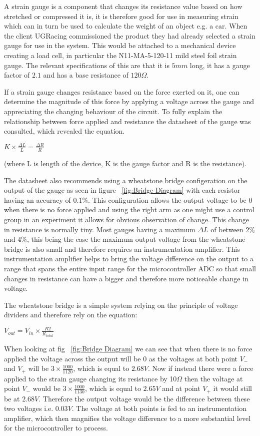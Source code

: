A strain gauge is a component that changes its resistance value based on how stretched or compressed it is, it is therefore good for use in measuring strain which can in turn be used to calculate the weight of an object e.g. a car. When the client UGRacing commissioned the product they had already selected a strain gauge for use in the system. This would be attached to a mechanical device creating a load cell, in particular the N11-MA-5-120-11 mild steel foil strain gauge. The relevant specifications of this are that it is $5\unit{mm}$ long, it has a gauge factor of $2.1$ and has a base resistance of $120\Omega$.

If a strain gauge changes resistance based on the force exerted on it, one can determine the magnitude of this force by applying a voltage across the gauge and appreciating the changing behaviour of the circuit. To fully explain the relationship between force applied and resistance the datasheet of the gauge\cite{strain_data_sheet} was consulted, which revealed the equation.

\centerline{$K \times \frac{\Delta L}{L} = \frac{\Delta R}{R}$}\label{eq:strain}

 (where L is length of the device, K is the gauge factor and R is the resistance).  

The datasheet also recommends using a wheatstone bridge configeration on the output of the gauge as seen in figure ~\ref{fig:Bridge Diagram} with each resistor having an accuracy of $0.1\%$. This configuration allows the output voltage to be $0$ when there is no force applied and using the right arm as one might use a control group in an experiment it allows for obvious observation of change. This change in resistance is normally tiny. Most gauges having a maximum $\Delta L$ of between $2\%$ and $4\%$, this being the case the maximum output voltage from the wheatstone bridge is also small and therefore requires an instrumentation amplifier. This instrumentation amplifier helps to bring the voltage difference on the output to a range that spans the entire input range for the microcontroller ADC so that small changes in resistance can have a bigger and therefore more noticeable change in voltage.

The wheatstone bridge is a simple system relying on the principle of voltage dividers and therefore rely on the equation:

\centerline{$V_{out} = V_{in} \times \frac{R2}{R_{total}}$}\label{eq:divider}

When looking at fig ~\ref{fig:Bridge Diagram} we can see that when there is no force applied the voltage across the output will be $0$ as the voltages at both point $V_-$ and $V_+$ will be $3 \times \frac{1000}{1120}$, which is equal to $2.68\unit{V}$. Now if instead there were a force applied to the strain gauge changing its resistance by 10$\Omega$ then the voltage at point $V_-$ would be $3 \times \frac{1000}{1130}$, which is equal to $2.65\unit{V}$ and at point $V_+$ it would still be at $2.68\unit{V}$. Therefore the output voltage would be the difference between these two voltages i.e. $0.03\unit{V}$. The voltage at both points is fed to an instrumentation amplifier, which then magnifies the voltage difference to a more substantial level for the microcontroller to process. 


